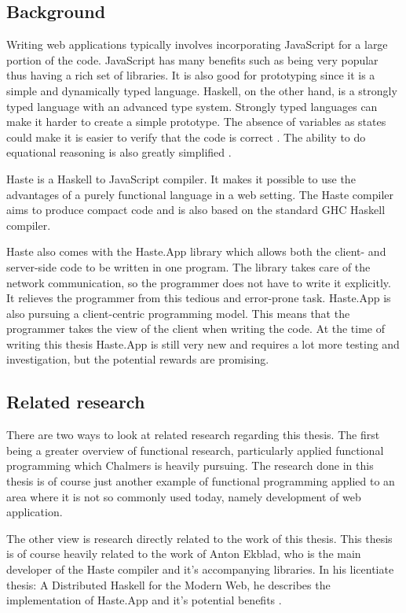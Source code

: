\documentclass[a4paper]{article}
\begin{document}
\subsection{Background}
Writing web applications typically involves incorporating JavaScript for a large portion of the code. JavaScript has many benefits such as being very popular thus having a rich set of libraries. It is also good for prototyping since it is a simple and dynamically typed language. Haskell, on the other hand, is a strongly typed language with an advanced type system. Strongly typed languages can make it harder to create a simple prototype. The absence of variables as states could make it is easier to verify that the code is correct \cite{marlow2010haskell}. The ability to do equational reasoning is also greatly simplified \autocite{equational-reasoning}.

Haste is a Haskell to JavaScript compiler. It makes it possible to use the advantages of a purely functional language in a web setting. The Haste compiler aims to produce compact code and is also based on the standard GHC Haskell compiler. 

Haste also comes with the Haste.App library which allows both the client- and server-side code to be written in one program\cite{ekblad2015seamless}. The library takes care of the network communication, so the programmer does not have to write it explicitly. It relieves the programmer from this tedious and error-prone task. Haste.App is also pursuing a client-centric programming model. This means that the programmer takes the view of the client when writing the code\cite{a-distributed-haskell-for-the-modern-web}. At the time of writing this thesis Haste.App is still very new and requires a lot more testing and investigation, but the potential rewards are promising.



\subsection{Related research}
There are two ways to look at related research regarding this thesis. The first being a greater overview of functional research, particularly applied functional programming which Chalmers is heavily pursuing. The research done in this thesis is of course just another example of functional programming applied to an area where it is not so commonly used today, namely development of web application.  

The other view is research directly related to the work of this thesis. This thesis is of course heavily related to the work of Anton Ekblad, who is the main developer of the Haste compiler and it's accompanying libraries. In his licentiate thesis: A Distributed Haskell for the Modern Web, he describes the implementation of Haste.App and it's potential benefits \cite{a-distributed-haskell-for-the-modern-web}.
\end{document}
